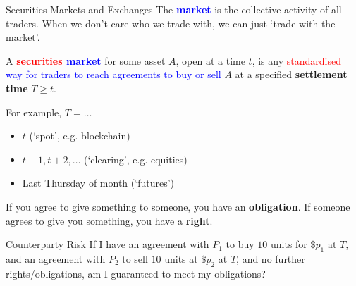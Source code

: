 \documentclass{beamer}
\begin{document}
\begin{frame}{Securities Markets and Exchanges}
	The \textbf{\textcolor{blue}{market}} is the collective activity of all traders. When we don't care who we trade with, we can just `trade with the market'.

	A \textbf{\textcolor{red}{securities} \textcolor{blue}{market}} for some asset $A$, open at a time $t$, is any \textcolor{red}{standardised} \textcolor{blue}{way for traders to reach agreements to buy or sell} $A$ at a specified \textbf{settlement time} $T\geq t$. %

	\pause

	For example, $T=\ldots$
	\begin{itemize}
		\item $t$ (`spot', e.g. blockchain) %
		\item $t+1, t+2, \ldots$ (`clearing', e.g. equities)
		\item Last Thursday of month (`futures')
	\end{itemize}

	\pause
	If you agree to give something to someone, you have an \textbf{obligation}. If someone agrees to give you something, you have a \textbf{right}.

	\begin{block}{Counterparty Risk}
		If I have an agreement with $P_1$ to buy $10$ units for $\$p_1$ at $T$, and an agreement with $P_2$ to sell $10$ units at $\$p_2$ at $T$, and no further rights/obligations, am I guaranteed to meet my obligations?
	\end{block}
\end{frame}
\end{document}
